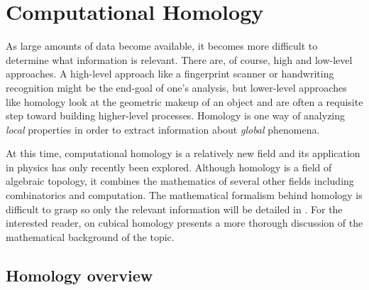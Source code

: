 \chapter{Computational Homology} \label{ch:homology}

As large amounts of data become available, it becomes more difficult to determine what information is relevant. There are, of course, high and low-level approaches. A high-level approach like a fingerprint scanner or handwriting recognition might be the end-goal of one's analysis, but lower-level approaches like homology look at the geometric makeup of an object and are often a requisite step toward building higher-level processes. Homology is one way of analyzing \textit{local} properties in order to extract information about \textit{global} phenomena.

	At this time, computational homology is a relatively new field and its application in physics has only recently been explored. Although homology is a field of algebraic topology, it combines the mathematics of several other fields including combinatorics and computation. The mathematical formalism behind homology is difficult to grasp so only the relevant information will be detailed in . For the interested reader,  on cubical homology presents a more thorough discussion of the mathematical background of the topic.
		
\section{Homology overview} \label{sect:homologyoverview}

